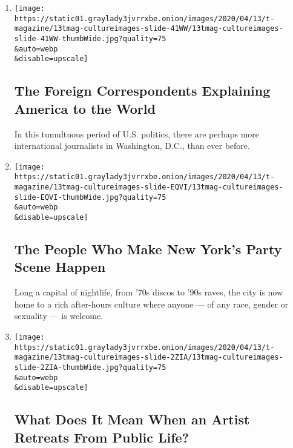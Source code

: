 \begin{enumerate}
\def\labelenumi{\arabic{enumi}.}
\item
  \href{/interactive/2020/04/13/t-magazine/foreign-correspondents.html}{}

  \texttt{[image: https://static01.graylady3jvrrxbe.onion/images/2020/04/13/t-magazine/13tmag-cultureimages-slide-41WW/13tmag-cultureimages-slide-41WW-thumbWide.jpg?quality=75\\\&auto=webp\\\&disable=upscale]}

  \hypertarget{the-foreign-correspondents-explaining-america-to-the-world}{%
  \subsection{The Foreign Correspondents Explaining America to the
  World}\label{the-foreign-correspondents-explaining-america-to-the-world}}

  In this tumultuous period of U.S. politics, there are perhaps more
  international journalists in Washington, D.C., than ever before.
\item
  \href{/interactive/2020/04/13/t-magazine/nyc-downtown-nightlife-party-scene.html}{}

  \texttt{[image: https://static01.graylady3jvrrxbe.onion/images/2020/04/13/t-magazine/13tmag-cultureimages-slide-EQVI/13tmag-cultureimages-slide-EQVI-thumbWide.jpg?quality=75\\\&auto=webp\\\&disable=upscale]}

  \hypertarget{the-people-who-make-new-yorks-party-scene-happen}{%
  \subsection{The People Who Make New York's Party Scene
  Happen}\label{the-people-who-make-new-yorks-party-scene-happen}}

  Long a capital of nightlife, from '70s discos to '90s raves, the city
  is now home to a rich after-hours culture where anyone --- of any
  race, gender or sexuality --- is welcome.
\item
  \href{/interactive/2020/04/13/t-magazine/artist-recluse.html}{}

  \texttt{[image: https://static01.graylady3jvrrxbe.onion/images/2020/04/13/t-magazine/13tmag-cultureimages-slide-2ZIA/13tmag-cultureimages-slide-2ZIA-thumbWide.jpg?quality=75\\\&auto=webp\\\&disable=upscale]}

  \hypertarget{what-does-it-mean-when-an-artist-retreats-from-public-life}{%
  \subsection{What Does It Mean When an Artist Retreats From Public
  Life?}\label{what-does-it-mean-when-an-artist-retreats-from-public-life}}


\end{enumerate}

